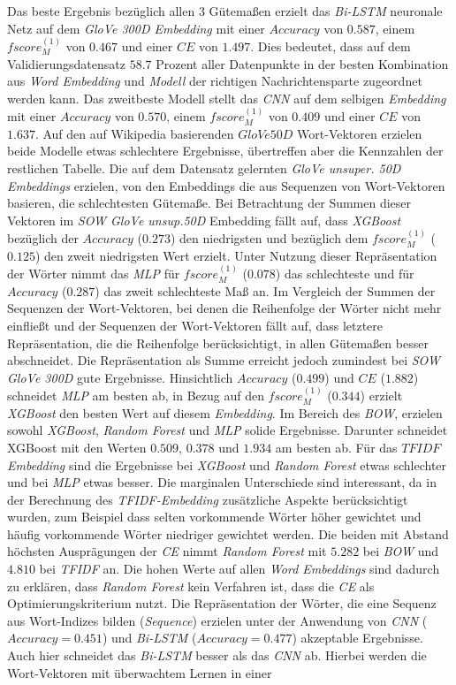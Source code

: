 \documentclass[a4paper,11pt]{article}
\begin{document}
Das beste Ergebnis bezüglich allen $3$ Gütemaßen erzielt das \textit{Bi-LSTM} neuronale Netz auf dem \textit{GloVe 300D Embedding} mit einer $Accuracy$ von $0.587$, einem $fscore_M^{(1)}$ von $0.467$ und einer $CE$ von $1.497$. Dies bedeutet, dass auf dem Validierungsdatensatz $58.7$ Prozent aller Datenpunkte in der besten Kombination aus \textit{Word Embedding} und \textit{Modell} der richtigen Nachrichtensparte zugeordnet werden kann. Das zweitbeste Modell stellt das \textit{CNN} auf dem selbigen \textit{Embedding} mit einer $Accuracy$ von $0.570$, einem $fscore_M^{(1)}$ von $0.409$ und einer $CE$ von $1.637$. Auf den auf Wikipedia basierenden $GloVe 50D$ Wort-Vektoren erzielen beide Modelle etwas schlechtere Ergebnisse, übertreffen aber die Kennzahlen der restlichen Tabelle. Die auf dem Datensatz gelernten \textit{GloVe unsuper. 50D} \textit{Embeddings} erzielen, von den Embeddings die aus Sequenzen von Wort-Vektoren basieren, die schlechtesten Gütemaße. Bei Betrachtung der Summen dieser Vektoren im \textit{SOW GloVe unsup.50D} Embedding fällt auf, dass \textit{XGBoost} bezüglich der $Accuracy$ ($0.273$) den niedrigsten und bezüglich dem $fscore_M^{(1)}$ ($0.125$) den zweit niedrigsten Wert erzielt. Unter Nutzung dieser Repräsentation der Wörter nimmt das \textit{MLP} für $fscore_M^{(1)}$ ($0.078$) das schlechteste und für $Accuracy$ ($0.287$) das zweit schlechteste Maß an. Im Vergleich der Summen der Sequenzen der Wort-Vektoren, bei denen die Reihenfolge der Wörter nicht mehr einfließt und der Sequenzen der Wort-Vektoren fällt auf, dass letztere Repräsentation, die die Reihenfolge berücksichtigt, in allen Gütemaßen besser abschneidet. Die Repräsentation als Summe erreicht jedoch zumindest bei \textit{SOW GloVe 300D} gute Ergebnisse. Hinsichtlich $Accuracy$ ($0.499$) und $CE$ ($1.882$) schneidet \textit{MLP} am besten ab, in Bezug auf den $fscore_M^{(1)}$ ($0.344$) erzielt \textit{XGBoost} den besten Wert auf diesem \textit{Embedding}. Im Bereich des \textit{BOW}, erzielen sowohl \textit{XGBoost}, \textit{Random Forest} und \textit{MLP} solide Ergebnisse. Darunter schneidet XGBoost mit den Werten $0.509$, $0.378$ und $1.934$ am besten ab. Für das $TFIDF$ \textit{Embedding} sind die Ergebnisse bei \textit{XGBoost} und \textit{Random Forest} etwas schlechter und bei \textit{MLP} etwas besser. Die marginalen Unterschiede sind interessant, da in der Berechnung des \textit{TFIDF-Embedding} zusätzliche Aspekte berücksichtigt wurden, zum Beispiel dass selten vorkommende Wörter höher gewichtet und häufig vorkommende Wörter niedriger gewichtet werden. Die beiden mit Abstand höchsten Ausprägungen der \textit{CE} nimmt \textit{Random Forest} mit $5.282$ bei \textit{BOW} und $4.810$ bei \textit{TFIDF} an. Die hohen Werte auf allen \textit{Word Embeddings} sind dadurch zu erklären, dass \textit{Random Forest} kein Verfahren ist, dass die \textit{CE} als Optimierungskriterium nutzt. Die Repräsentation der Wörter, die eine Sequenz aus Wort-Indizes bilden (\textit{Sequence}) erzielen unter der Anwendung von \textit{CNN} ($Accuracy = 0.451$) und \textit{Bi-LSTM} ($Accuracy = 0.477$) akzeptable Ergebnisse. Auch hier schneidet das \textit{Bi-LSTM} besser als das \textit{CNN} ab. Hierbei werden die Wort-Vektoren mit überwachtem Lernen in einer 
\end{document}
